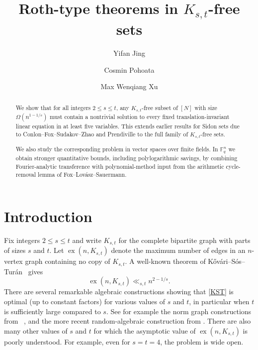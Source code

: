 \documentclass[A4paper,reqno,oneside,12pt]{amsart}
\title{\vspace{-0.7cm} Roth-type theorems in $K_{s,t}$-free sets}
\author{Yifan Jing}
\author{Cosmin Pohoata}
\author{Max Wenqiang Xu}
\theoremstyle{plain}
\theoremstyle{definition}
\newcommand{\F}{\mathbb{F}}
\begin{document}
\begin{abstract}
We show that for all integers $2\le s\le t$, any $K_{s,t}$-free subset of $[N]$ with size $\Omega(n^{1-1/s})$ must contain a nontrivial solution to every fixed translation-invariant linear
equation in at least five variables. This extends earlier results for Sidon sets due to
Conlon--Fox--Sudakov--Zhao and Prendiville to the full family of $K_{s,t}$-free sets. 

We also study the corresponding problem in vector spaces over finite fields.
In $\F_q^n$ we obtain stronger quantitative bounds, including polylogarithmic savings, by combining
Fourier-analytic transference with polynomial-method input from the arithmetic cycle-removal lemma of Fox--Lov\'asz--Sauermann.

\end{abstract}
\maketitle

\section{Introduction}

Fix integers $2\le s\le t$ and write $K_{s,t}$ for the complete bipartite graph with parts of sizes
$s$ and $t$. Let $\operatorname{ex}(n,K_{s,t})$ denote the maximum number of edges in an $n$-vertex graph containing no copy of $K_{s,t}$. A well-known theorem of K\H{o}v\'ari--S\'os--Tur\'an~\cite{KST54} gives
\begin{equation} \label{KST}
\operatorname{ex}(n,K_{s,t}) \ll_{s,t} n^{2-1/s}.
\end{equation}
There are several remarkable algebraic constructions showing that \eqref{KST} is optimal (up to constant factors) for various values of $s$ and $t$, in particular when $t$ is sufficiently large compared to $s$. See for example the norm graph constructions from ~\cite{KRSz96,ARSz99}, and the more recent
random-algebraic construction from \cite{BukhCrazy}. There are also many other values of $s$ and $t$ for which the asymptotic value of $\operatorname{ex}(n,K_{s,t})$ is poorly understood. For example, even for $s=t=4$, the problem is wide open. 
\end{document}
